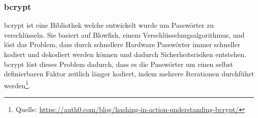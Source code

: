 \subsubsection{bcrypt}
\label{sec:bcrypt}
bcrypt ist eine Bibliothek welche entwickelt wurde um Passwörter zu verschlüsseln. Sie basiert auf Blowfish, einem Verschlüsselungsalgorithmus, und löst das Problem, dass durch schnellere Hardware Passwörter immer schneller kodiert und dekodiert werden können und dadurch Sicherheitsrisiken entstehen. bcrypt löst dieses Problem dadurch, dass es die Passwörter um einen selbst definierbaren Faktor zeitlich länger kodiert, indem mehrere Iterationen durchführt werden\footnote{Quelle: \url{https://auth0.com/blog/hashing-in-action-understanding-bcrypt/}}.
        